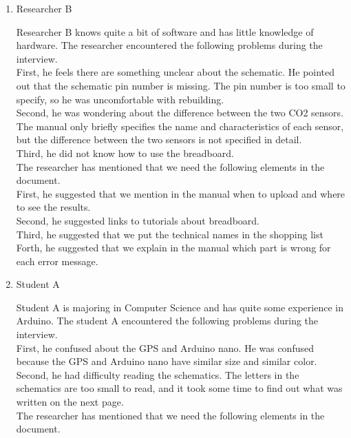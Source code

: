 \documentclass[conference]{IEEEtran}
\begin{document}
\begin{enumerate}
\begin{enumerate}
\item Researcher B

Researcher B knows quite a bit of software and has little knowledge of hardware. The researcher encountered the following problems during the interview.\\

		First, he feels there are something unclear about the schematic. He pointed out that the schematic pin number is missing. The pin number is too small to specify, so he was uncomfortable with rebuilding.\\
		Second, he was wondering about the difference between the two CO2 sensors. The manual only briefly specifies the name and characteristics of each sensor, but the difference between the two sensors is not specified in detail.\\
		Third, he did not know how to use the breadboard.\\

The researcher has mentioned that we need the following elements in the document.\\

		First, he suggested that we mention in the manual when to upload and where to see the results. \\
		Second, he suggested links to tutorials about breadboard.\\
		Third, he suggested that we put the technical names in the shopping list\\
		Forth, he suggested that we explain in the manual which part is wrong for each error message.\\

\item Student A

Student A is majoring in Computer Science and has  quite some experience in Arduino. The student A encountered the following problems during the interview.\\

		First, he confused about the GPS and Arduino nano. He was confused because the GPS and Arduino nano have similar size and similar color.\\
		Second, he had difficulty reading the schematics. The letters in the schematics are too small to read, and it took some time to find out what was written on the next page.\\

The researcher has mentioned that we need the following elements in the document.\\


\end{enumerate}
\end{enumerate}
\end{document}
